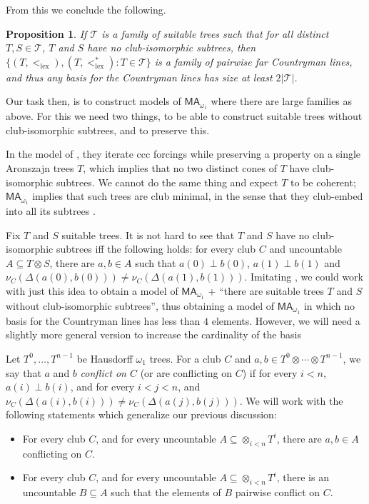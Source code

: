 \documentclass[10pt,a4paper]{amsart}
\newtheorem{proposition}[theorem]{Proposition}
\theoremstyle{definition}
\newcommand{\seb}{\subseteq}
\newcommand{\MA}{\textsf{MA}}
\newcommand{\1}{\mathbf{1}}
\newcommand{\T}{\mathcal{T}}
\newcommand{\prop}{\Xi}
\newcommand{\propp}{\prop^{+}}
\DeclareMathOperator{\lex}{lex}
\begin{document}
From this we conclude the following.

\begin{proposition}\label{prop:basis}
  If $\T$ is a family of suitable trees such that for all distinct
  $T,S \in \T$, $T$ and $S$ have no club-isomorphic subtrees,
  then $\{(T,<_{\lex}),(T,<_{\lex}^{*}) : T \in \T\}$
  is a family of pairwise far
  Countryman lines, and thus any basis for the Countryman lines
  has size at least $2|\T|$.
\end{proposition}

Our task then, is to construct models of $\MA_{\omega_{1}}$
where there are large families as above. For this we need two things,
to be able to construct suitable trees without club-isomorphic subtrees,
and to preserve this.

In the model of \cite{ShelahAbraham}, they iterate ccc forcings while
preserving a property on a single Aronszajn trees
$T$, which implies that no two
distinct cones of $T$ have club-isomorphic subtrees. We cannot do the
same thing and expect $T$ to be coherent;
$\MA_{\omega_{1}}$ implies that such trees are club minimal,
in the sense that they club-embed into all its subtrees \cite{Todorcevic2007}.

Fix $T$ and $S$ suitable trees. It is not hard to see that $T$ and $S$ have no
club-isomorphic subtrees iff the following holds: for every club $C$
and uncountable $A \seb T \otimes S$, there are $a,b \in A$ such that
$a(0) \perp b(0)$, $a(1) \perp b(1)$ and $\nu_{C}(\Delta(a(0),b(0)))
\neq \nu_{C}(\Delta(a(1),b(1)))$.
Imitating \cite{ShelahAbraham}, we could work with just this idea
to obtain a model of $\MA_{\omega_{1}}$ + ``there are suitable
trees $T$ and $S$ without club-isomorphic subtrees'', thus obtaining
a model of $\MA_{\omega_{1}}$ in which no basis for the Countryman lines
has less than $4$ elements. However, we will need a slightly more general
version to increase the cardinality of the basis

Let $T^{0},\dots,T^{n-1}$ be Hausdorff $\omega_{1}$ trees.
For a club $C$ and $a,b \in T^{0} \otimes \cdots \otimes T^{n-1}$, we say that
$a$ and $b$ \emph{conflict on $C$} (or are conflicting on $C$)
if for every $i < n$, $a(i) \perp b(i)$,
and for every $i < j < n$,
and $\nu_{C}(\Delta(a(i),b(i))) \neq \nu_{C}(\Delta(a(j),b(j)))$.
We will work with the following statements which generalize our previous
discussion:

\begin{itemize}[topsep=1em,align=left]
  \item[$\prop(T^{0},\dots,T^{n-1})$]
  For every club $C$, and
  for every uncountable $A \seb \otimes_{i < n}T^{i}$, there are
  $a,b \in A$ conflicting on $C$.
  \item[$\propp(T^{0},\dots,T^{n-1})$]
  For every club $C$, and
  for every uncountable $A \seb \otimes_{i < n}T^{i}$, there is an
  uncountable $B \seb A$ such that the elements of $B$ pairwise conflict
  on $C$.
\end{itemize}
\end{document}
